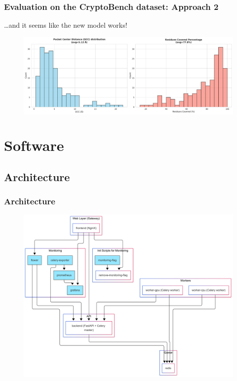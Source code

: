 \documentclass[aspectratio=169]{beamer}
\begin{document}
\begin{frame}
  \frametitle{Evaluation on the CryptoBench dataset: Approach 2}

  \dots and it seems like the new model works!

  \begin{figure}
    \includegraphics[width=\textwidth]{fig/smoothened-1.pdf}
  \end{figure}
\end{frame}

\section{Software}

\subsection{Architecture}

\begin{frame}
  \frametitle{Architecture}
  \begin{figure}
    \centering
    \includegraphics[width=\linewidth,height=0.8\textheight,keepaspectratio]{fig/architecture.png}
  \end{figure}
\end{frame}
\end{document}
